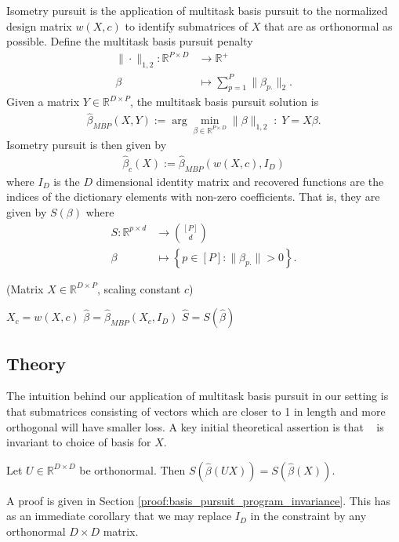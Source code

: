 Isometry pursuit is the application of multitask basis pursuit to the normalized design matrix $w(X, c)$ to identify submatrices of $ X$ that are as orthonormal as possible.
Define the multitask basis pursuit penalty 
\begin{align}
\label{eq:bp}
\| \cdot \|_{1,2}: \mathbb R^{P \times D} &\to \mathbb R^+ \\ 
\beta &\mapsto  \sum_{p=1}^P  \|\beta_{p.}\|_2.
\end{align}
Given a matrix $Y \in \mathbb R^{D \times P}$, the multitask basis pursuit solution is
\begin{align}
\label{prog:multitask_basis_pursuit}
\widehat \beta_{MBP} (X, Y)  := \arg \min_{\beta \in \mathbb R^{P \times D}} \| \beta \|_{1,2} \; : \;Y =  X \beta.
\end{align}
Isometry pursuit is then given by
\begin{align}
\label{prog:isometry_pursuit}
\widehat \beta_c ( X) := \widehat \beta_{MBP} ( w(X,c), I_D )
\end{align}
where $I_D$ is the $D$ dimensional identity matrix and recovered functions are the indices of the dictionary elements with non-zero coefficients.
That is, they are given by $S(\beta)$ where
\begin{align}
S: \mathbb{R}^{p \times d} &\to \binom{[P]}{d} \\
\beta &\mapsto \left\{ p \in [P] :  \|\beta_{p.}\| > 0 \right\}.
\end{align}
\begin{algorithm}[H]
\caption{\isometrypursuit(Matrix ${X} \in \mathbb{R}^{D \times P}$, scaling constant $c$)}
\begin{algorithmic}[1]
 $X_c = w({X},c)$
 $\widehat \beta = \widehat \beta_{MBP} (X_c, I_D)$
 $\widehat{S} = S (\widehat \beta)$
\end{algorithmic}
\end{algorithm}

\subsection{Theory}

The intuition behind our application of multitask basis pursuit in our setting is that submatrices consisting of vectors which are closer to 1 in length and more orthogonal will have smaller loss.
A key initial theoretical assertion is that  \isometrypursuit~ is invariant to choice of basis for $ X$.
\begin{proposition}
\label{prop:basis_pursuit_selection_invariance}
Let $U \in \mathbb R^{D \times D}$ be orthonormal.
Then $S(\widehat \beta  (U  X)) = S(\widehat \beta ( X))$.
\end{proposition}
A proof is given in Section \ref{proof:basis_pursuit_program_invariance}.
This has as an immediate corollary that we may replace $I_D$ in the constraint by any orthonormal $D \times D$ matrix.

